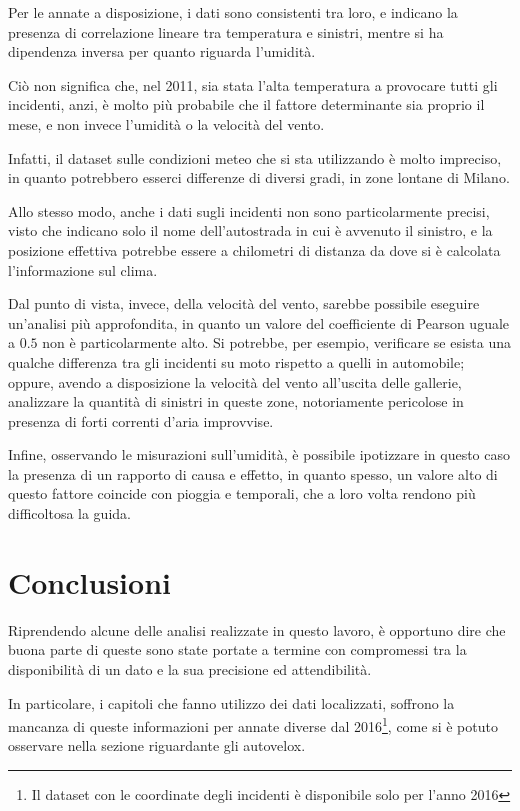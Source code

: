 \documentclass[a4paper,12pt]{report}
\begin{document}
Per le annate a disposizione, i dati sono consistenti tra loro, e indicano la presenza di 
correlazione lineare tra temperatura e sinistri, mentre si ha dipendenza inversa per quanto 
riguarda l'umidità. 

Ciò non significa che, nel 2011, sia stata l'alta temperatura a provocare 
tutti gli incidenti, anzi, è molto più probabile che il fattore determinante 
sia proprio il mese, e non invece l'umidità o la velocità del vento. 

Infatti, il dataset sulle condizioni meteo che si sta utilizzando è molto impreciso, 
in quanto potrebbero esserci differenze di diversi gradi, in zone lontane di Milano. 

Allo stesso modo, anche i dati sugli incidenti non sono particolarmente precisi, 
visto che indicano solo il nome dell'autostrada in cui è avvenuto 
il sinistro, e la posizione effettiva potrebbe essere a chilometri di distanza da dove 
si è calcolata l'informazione sul clima. 

Dal punto di vista, invece, della velocità del vento, sarebbe possibile eseguire 
un'analisi più approfondita, in quanto un valore del coefficiente di Pearson uguale 
a $0.5$ non è particolarmente alto. 
Si potrebbe, per esempio, verificare se esista una qualche differenza tra gli 
incidenti su moto rispetto a quelli in automobile; 
oppure, avendo a disposizione la velocità del vento all'uscita delle gallerie, 
analizzare la quantità di sinistri in queste zone, notoriamente pericolose 
in presenza di forti correnti d'aria improvvise. 

Infine, osservando le misurazioni sull'umidità, è possibile ipotizzare 
in questo caso la presenza di un rapporto di causa e effetto, 
in quanto spesso, un valore alto di questo fattore 
coincide con pioggia e temporali, che a loro volta rendono più difficoltosa la guida. 

\chapter{Conclusioni}

Riprendendo alcune delle analisi realizzate in questo lavoro, è opportuno dire che buona 
parte di queste sono state portate a termine con compromessi 
tra la disponibilità di un dato e la sua precisione ed attendibilità.

In particolare, i capitoli che fanno utilizzo dei dati localizzati, soffrono la mancanza di 
queste informazioni per annate diverse dal 
2016\footnote{Il dataset con le coordinate degli incidenti è disponibile solo per l'anno 2016}, 
come si è potuto osservare nella sezione riguardante gli autovelox. 
\end{document}
